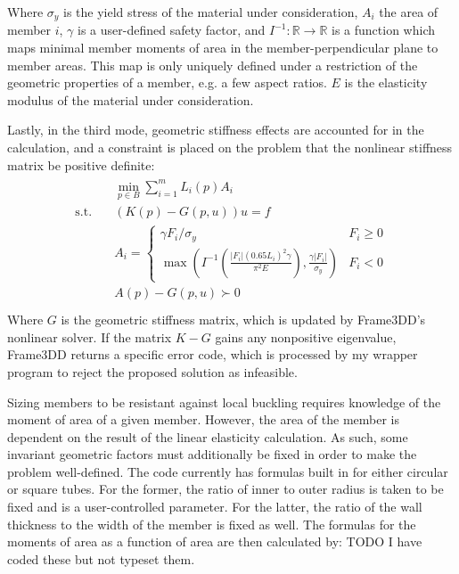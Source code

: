 \documentclass{article}
\begin{document}
Where $\sigma_y$ is the yield stress of the material under consideration, $A_i$ the area of
member $i$, $\gamma$ is a user-defined safety factor, and $I^{-1} : \mathbb{R} \rightarrow \mathbb{R}$
is a function which maps minimal member moments of area in the member-perpendicular plane to member areas.
This map is only uniquely defined under a restriction of the geometric properties of a member, e.g. a few aspect ratios.
$E$ is the elasticity modulus of the material under consideration.

Lastly, in the third mode, geometric stiffness effects are accounted for in the calculation,
and a constraint is placed on the problem that the nonlinear stiffness matrix be positive
definite:
\begin{align}
\begin{split}
  & \min_{p\in B} \sum_{i=1}^m L_i(p) A_i \\
  \text{s.t.} \quad & \left(K(p)-G(p,u)\right) u = f \\
                    & A_i = \begin{cases} \gamma F_i / \sigma_y & F_i  \geq 0 \\
                      \max\left(I^{-1}\left(\frac{|F_i| (0.65 L_i)^2 \gamma}{\pi^2 E}\right), \frac{\gamma|F_i|}{\sigma_y}\right) & F_i < 0
                    \end{cases} \\
                    & A(p) - G(p,u) \succ 0 \\
\end{split}
\label{eq:mode3}
\end{align}
Where $G$ is the geometric stiffness matrix, which is updated by Frame3DD's nonlinear solver.
If the matrix $K-G$ gains any nonpositive eigenvalue, Frame3DD returns a specific error code,
which is processed by my wrapper program to reject the proposed solution as infeasible.

Sizing members to be resistant against local buckling requires knowledge of the moment of area
of a given member. However, the area of the member is dependent on the result of the linear
elasticity calculation. As such, some invariant geometric factors must additionally be
fixed in order to make the problem well-defined. The code currently has formulas built
in for either circular or square tubes. For the former, the ratio of inner to outer radius
is taken to be fixed and is a user-controlled parameter. For the latter, the ratio of the
wall thickness to the width of the member is fixed as well. The formulas for the moments
of area as a function of area are then calculated by: TODO I have coded these but not typeset
them.
\end{document}
